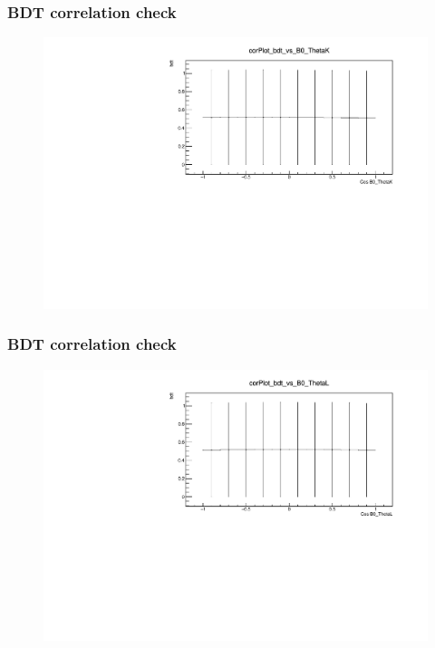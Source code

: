 \documentclass{beamer}
\begin{document}
\begin{frame}
  \frametitle{BDT correlation check}

  \begin{figure}
  \includegraphics[width=1.0\linewidth]{plots/corPlot_bdt_vs_B0_ThetaK.pdf}
  \end{figure}

\end{frame}

\begin{frame}
  \frametitle{BDT correlation check}

  \begin{figure}
  \includegraphics[width=1.0\linewidth]{plots/corPlot_bdt_vs_B0_ThetaL.pdf}
  \end{figure}

\end{frame}
\end{document}

